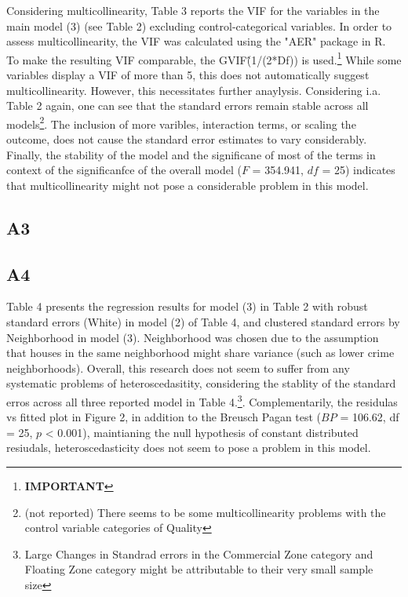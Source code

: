 \documentclass[a4paper]{article}
\begin{document}
Considering multicollinearity, Table 3 reports the VIF for the variables in the main model (3) (see Table 2) excluding control-categorical variables. In order to assess multicollinearity, the VIF was calculated using the "AER" package in R. To make the resulting VIF comparable, the GVIF\^(1/(2*Df)) is used.\footnote{\textbf{IMPORTANT %
}} While some variables display a VIF of more than 5, this does not automatically suggest multicollinearity. However, this necessitates further anaylysis. Considering i.a. Table 2 again, one can see that the standard errors remain stable across all models\footnote{(not reported) There seems to be some multicollinearity problems with the control variable categories of Quality}. The inclusion of more varibles, interaction terms, or scaling the outcome, does not cause the standard error estimates to vary considerably. Finally, the stability of the model and the significane of most of the terms in context of the significanfce of the overall model ($F$ = 354.941, $df$ = 25) indicates that multicollinearity might not pose a considerable problem in this model.



\subsection{A3}


\subsection{A4}
Table 4 presents the regression results for model (3) in Table 2 with robust standard errors (White) in model (2) of Table 4, and clustered standard errors by Neighborhood in model (3). Neighborhood was chosen due to the assumption that houses in the same neighborhood might share variance (such as lower crime neighborhoods). Overall, this research does not seem to suffer from any systematic problems of heteroscedasitity, considering the stablity of the standard erros across all three reported model in Table 4.\footnote{Large Changes in Standrad errors in the Commercial Zone category and Floating Zone category might be attributable to their very small sample size}. Complementarily, the residulas vs fitted plot in Figure 2, in addition to the Breusch Pagan test ($BP$ = 106.62, df = 25, $p$ < 0.001), maintianing the null hypothesis of constant distributed resiudals, heteroscedasticity does not seem to pose a problem in this model. 
\end{document}
